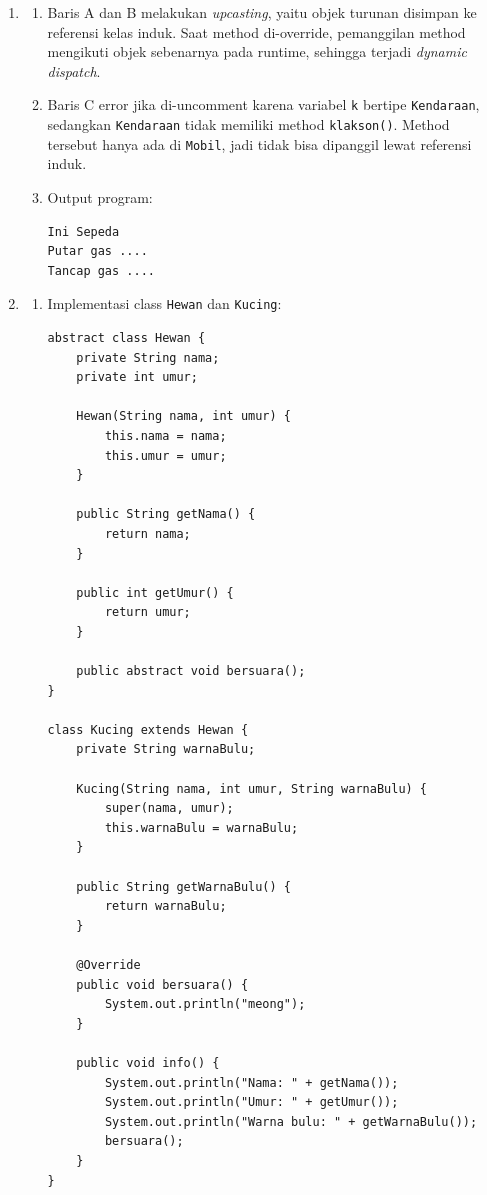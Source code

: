 \documentclass[11pt]{article}
\begin{document}
\begin{enumerate}
  \item
        \begin{enumerate}[label=\alph*)]
          \item Baris A dan B melakukan \textit{upcasting}, yaitu objek turunan disimpan ke referensi kelas induk. Saat method di-override, pemanggilan method mengikuti objek sebenarnya pada runtime, sehingga terjadi \textit{dynamic dispatch}.

          \item Baris C error jika di-uncomment karena variabel \texttt{k} bertipe \texttt{Kendaraan}, sedangkan \texttt{Kendaraan} tidak memiliki method \texttt{klakson()}. Method tersebut hanya ada di \texttt{Mobil}, jadi tidak bisa dipanggil lewat referensi induk.

          \item Output program:
                \begin{verbatim}
Ini Sepeda
Putar gas ....
Tancap gas ....
                \end{verbatim}
        \end{enumerate}

  \item
        \begin{enumerate}[label=\alph*)]
          \item Implementasi class \texttt{Hewan} dan \texttt{Kucing}:
                \begin{verbatim}
abstract class Hewan {
    private String nama;
    private int umur;

    Hewan(String nama, int umur) {
        this.nama = nama;
        this.umur = umur;
    }

    public String getNama() {
        return nama;
    }

    public int getUmur() {
        return umur;
    }

    public abstract void bersuara();
}

class Kucing extends Hewan {
    private String warnaBulu;

    Kucing(String nama, int umur, String warnaBulu) {
        super(nama, umur);
        this.warnaBulu = warnaBulu;
    }

    public String getWarnaBulu() {
        return warnaBulu;
    }

    @Override
    public void bersuara() {
        System.out.println("meong");
    }

    public void info() {
        System.out.println("Nama: " + getNama());
        System.out.println("Umur: " + getUmur());
        System.out.println("Warna bulu: " + getWarnaBulu());
        bersuara();
    }
}
                \end{verbatim}


\end{enumerate}
\end{enumerate}
\end{document}
